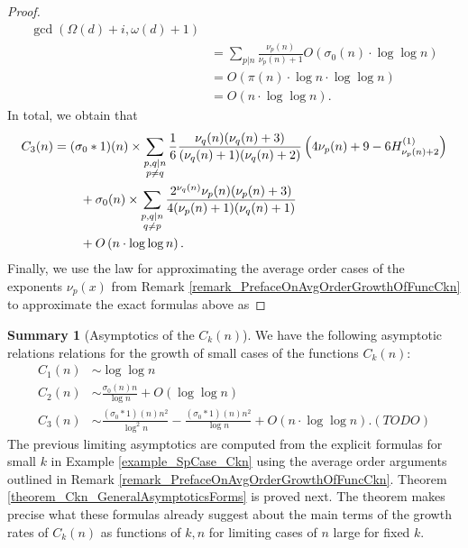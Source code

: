 \documentclass[11pt,reqno,a4letter]{article}
\numberwithin{figure}{section}
\numberwithin{table}{section}
\theoremstyle{plain}
\numberwithin{theorem}{section}
\theoremstyle{definition}
\newtheorem{summary}[theorem]{Summary}
\begin{document}
\begin{proof}
\begin{align*}
     \gcd\left(\Omega(d) + i, \omega(d) + 1\right) \\ 
     & = \sum_{p|n} \frac{\nu_p(n)}{\nu_p(n) + 1} O\left(\sigma_0(n) \cdot \log\log n\right) \\ 
     & = O\left(\pi(n) \cdot \log n \cdot \log\log n\right) \\ 
     & = O\left(n \cdot \log\log n\right). 
\end{align*} 
In total, we obtain that 
\begin{align} 
\label{eqn_ExactFormula_Ck3n} 
C_3(n) & = (\sigma_0 \ast 1)(n) \times \sum_{\substack{p,q|n \\ p \neq q}} 
     \frac{1}{6}\frac{\nu_q(n) (\nu_q(n) + 3)}{ 
     (\nu_q(n)+1)(\nu_q(n)+2)} \left(4\nu_p(n)+9-6 H_{\nu_p(n)+2}^{(1)}\right) \\ 
\notag 
     & \phantom{= \quad\ } + 
     \sigma_0(n) \times \sum_{\substack{p,q|n \\ q \neq p}} 
     \frac{2^{\nu_q(n)} \nu_p(n) (\nu_p(n) + 3)}{4 (\nu_p(n) + 1) (\nu_q(n) + 1)} \\ 
\notag
     & \phantom{= \quad\ } + 
     O\left(n \cdot \log\log n\right). 
\end{align} 
Finally, we use the law for approximating the average order cases of the exponents $\nu_p(x)$ 
from Remark \ref{remark_PrefaceOnAvgOrderGrowthOfFuncCkn} to 
approximate the exact formulas above as 

\end{proof} 

\begin{summary}[Asymptotics of the $C_k(n)$]
We have the following asymptotic relations relations for the growth of small cases of 
the functions $C_k(n)$: 
\begin{align*} 
C_1(n) & \sim \log\log n \\ 
C_2(n) & \sim \frac{\sigma_0(n) n}{\log n} + O(\log\log n) \\ 
C_3(n) & \sim \frac{(\sigma_0 \ast 1)(n) n^2}{\log^2 n} - 
     \frac{(\sigma_0 \ast 1)(n) n^2}{\log n} + 
     O\left(n \cdot \log\log n\right). (TODO) 
\end{align*} 
The previous limiting asymptotics are computed from the explicit formulas for small $k$ in 
Example \ref{example_SpCase_Ckn} using the average order arguments outlined in 
Remark \ref{remark_PrefaceOnAvgOrderGrowthOfFuncCkn}. 
Theorem \ref{theorem_Ckn_GeneralAsymptoticsForms} is proved next. The theorem 
makes precise what these formulas already 
suggest about the main terms of the growth rates of 
$C_k(n)$ as functions of $k,n$ for limiting cases of $n$ large for fixed $k$. 
\end{summary} 
\end{document}
